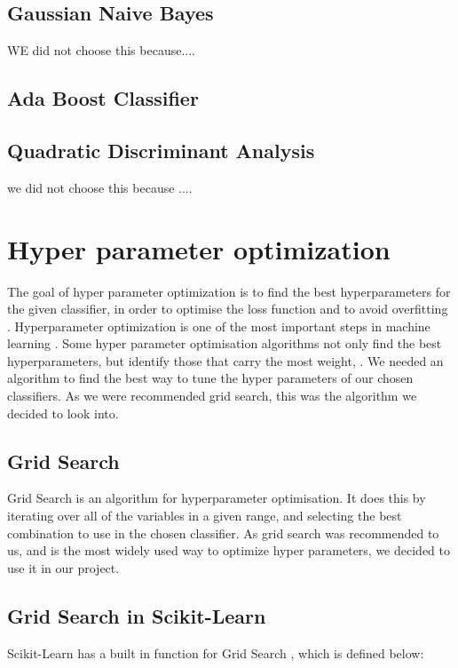 \documentclass{article}
\begin{document}
	\subsection{Gaussian Naive Bayes}
WE did not choose this because....
	
	\subsection{Ada Boost Classifier}
	
	\subsection{Quadratic Discriminant Analysis}
we did not choose this because ....


\section{Hyper parameter optimization}

	The goal of hyper parameter optimization is to find the best hyperparameters for the given classifier, in order to optimise the loss function and to avoid overfitting \cite{Bergstra}. Hyperparameter optimization is one of the most important steps in machine learning \cite{bardenet}. Some hyper parameter optimisation algorithms not only find the best hyperparameters, but identify those that carry the most weight, \cite{Bergstra}.
	We needed an algorithm to find the best way to tune the hyper parameters of our chosen classifiers.  As we were recommended grid search, this was the algorithm we decided to look into.  
	
	\subsection{Grid Search}
	
		Grid Search is an algorithm for hyperparameter optimisation. It does this by iterating over all of the variables in a given range, and selecting the best combination to use in the chosen classifier. 
		As grid search was recommended to us, and is the most widely used way to optimize hyper parameters, we decided to use it in our project.
		
	\subsection{Grid Search in Scikit-Learn}
	
		Scikit-Learn has a built in function for Grid Search \cite{gridsearch}, which is defined below:
		
\end{document}
